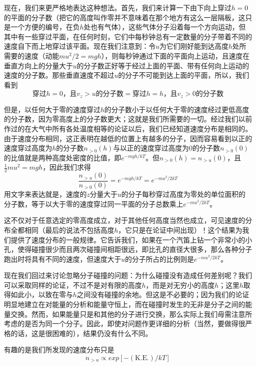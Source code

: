 现在，我们来更严格地表达这种想法。首先，我们来计算一下由下向上穿过$h=0$的平面的分子数（把它的高度叫作零并不意味着在那个地方有这么一层隔板，这只是一个方便的编号，在负$h$处也有气体），这些气体分子沿着每一个方向运动，但其中有一些穿过平面，在任何时刻，它们中每秒钟总有一定数量的分子带着不同的速度自下而上地穿过该平面。现在我们注意到：令$u$为它们刚好能到达高度$h$处所需要的速度（动能$mu^2/2=mgh$），则每秒钟通过下面的平面向上运动，且速度在垂直方向上的分量大于$u$的分子数正好等于经过上面的平面、带有任何向上运动的速度的分子数。那些垂直速度不超过$u$的分子不可能到达上面的平面，所以，我们看到
\begin{equation*}
    \text{穿过$h=0$，且$v_z>u$的分子数}=\text{穿过$h=h$，且$v_z>0$的分子数}
\end{equation*}

但是，以任何大于零的速度穿过$h$的分子数小于以任何大于零的速度经过更低高度的分子数，因为零高度上的分子数更大；这就是我们所需要的一切。经过我们以前作过的在大气中所有各处温度相等的论证以后，我们已经知道速度分布是相同的。由于速度分布相同，这正表明在越低的位置上有越多的分子，因而容易看到以正的速度穿过高度为$h$的分子数$n_{>0}(h)$与以正的速度穿过高度为$0$的分子数$n_{>0}(0)$的比值就是两种高度处密度的比值，即$e^{-mgh/kT}$。但$n_{>0}(h)=n_{>u}(0)$，且$\frac{1}{2}mu^2 = mgh$，因此我们求得
\begin{equation*}
    \frac{n_{>u}(0)}{n_{>0}(0)} = e^{-mgh/kT} = e^{-mu^2/2kT}
\end{equation*}
用文字来表达就是，速度的$z$分量大于$u$的分子每秒穿过高度为零处的单位面积的分子数，等于以大于零的速度穿过同一平面的分子总数乘上$e^{-mu^2/2kT}$。

这不仅对于任意选定的零高度成立，对于其他任何高度当然也成立，可见速度的分布全都相同（最后的说法不包括高度$h$，它只是在论证中间出现）！这个结果为我们提供了速度分布的一般规律。它告诉我们，如果在一个汽笛上钻一个非常小的小孔，使得碰撞很少而且两次碰撞间相距很远，即比孔的直径大很多，那么各种分子跑出时将具有不同的速度，但速度大于$u$的分子所占的比例则是$e^{-mu^2/2kT}$。

现在我们回过来讨论忽略分子碰撞的问题：为什么碰撞没有造成任何差别呢？我们可以采取同样的论证，不过不是对有限的高度$h$，而是对无穷小的高度$h$；这里$h$取得如此小，以致在零与$h$之间没有碰撞的余地。但这是不必要的；因为我们的论证明显地建立在对能量的分析和能量守恒上，而在碰撞时发生的无非是分子之间的能量交换。然而，如果能量只是和其他的分子进行交换，那么实际上我们毋需注意所考虑的是否为同一个分子。因此，即使对问题作更详细的分析（当然，要做得很严格的话，这是很困难的），结果仍没有什么不同。

有趣的是我们所发现的速度分布只是
\begin{equation}
    \label{Eq:I:40:4}
    n_{>u} \propto exp[-(\text{K.E.})/kT] 
\end{equation}

